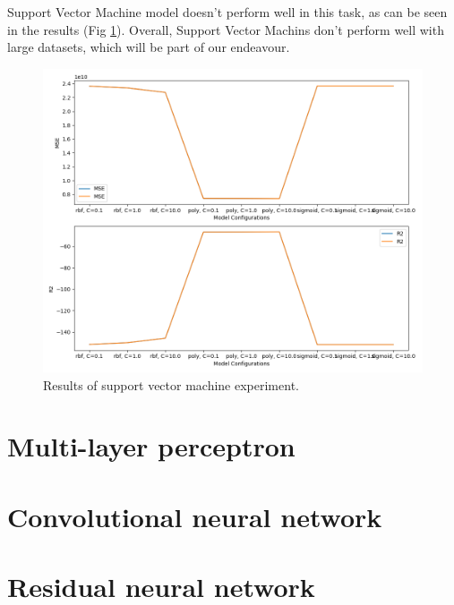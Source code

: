Support Vector Machine model doesn't perform well in this task, as can be seen in the results (Fig \ref{fig:svm}). Overall, Support Vector Machins don't perform well with large datasets, which will be part of our endeavour.

\begin{figure}[h!]
	\includegraphics[width=\linewidth]{"pictures/svm_models_results.png"}
	\caption{Results of support vector machine experiment.}
	\label{fig:svm}

\end{figure}
\section{Multi-layer perceptron}
\section{Convolutional neural network}
\section{Residual neural network}
